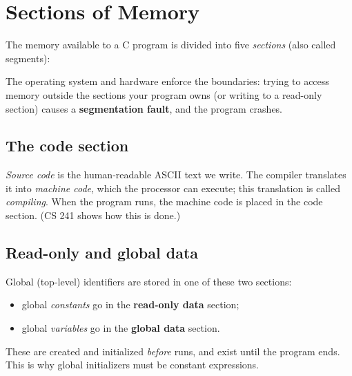 \section{Sections of Memory}

The memory available to a C program is divided into five \emph{sections} (also called
segments):

\begin{center}
\end{center}

The operating system and hardware enforce the boundaries: trying to access memory outside the
sections your program owns (or writing to a read-only section) causes a
\textbf{segmentation fault}, and the program crashes.

\subsection{The code section}

\emph{Source code} is the human-readable ASCII text we write. The compiler translates it into
\emph{machine code}, which the processor can execute; this translation is called
\emph{compiling}. When the program runs, the machine code is placed in the code section.
(CS 241 shows how this is done.)

\subsection{Read-only and global data}

Global (top-level) identifiers are stored in one of these two sections:
\begin{itemize}
  \item global \emph{constants} go in the \textbf{read-only data} section;
  \item global \emph{variables} go in the \textbf{global data} section.
\end{itemize}
These are created and initialized \emph{before}  runs, and exist until the program
ends. This is why global initializers must be constant expressions.


